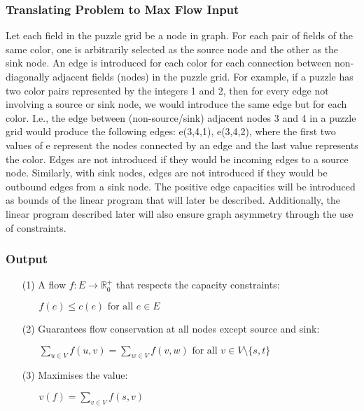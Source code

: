 \documentclass{homeworg}
\begin{document}
\subsubsection{Translating Problem to Max Flow Input}
Let each field in the puzzle grid be a node in graph. For each pair of fields of the same color, one is arbitrarily selected as the source node and the other as the sink node. An edge is introduced for each color for each connection between non-diagonally adjacent fields (nodes) in the puzzle grid. For example, if a puzzle has two color pairs represented by the integers 1 and 2, then for every edge not involving a source or sink node, we would introduce the same edge but for each color. I.e., the edge between (non-source/sink) adjacent nodes 3 and 4 in a puzzle grid would produce the following edges: e(3,4,1), e(3,4,2), where the first two values of e represent the nodes connected by an edge and the last value represents the color. Edges are not introduced if they would be incoming edges to a source node. Similarly, with sink nodes, edges are not introduced if they would be outbound edges from a sink node. The positive edge capacities will be introduced as bounds of the linear program that will later be described. Additionally, the linear program described later will also ensure graph asymmetry through the use of constraints. 
\subsubsection{Output}
\begin{enumerate}
    \item[(1)] A flow \(f:E\rightarrow \mathbb{R}_0^+\) that respects the capacity constraints:
        \begin{enumerate}
        	\item[] \(f(e)\leq c(e) \text{ for all } e \in E\)
        \end{enumerate}
    \item[(2)] Guarantees flow conservation at all nodes except source and sink: 
        \begin{enumerate}
        	\item[] \(\displaystyle\sum_{u \in V} f(u, v) = \sum_{w \in V} f(v, w) \text{ for all }v\in V \text{\textbackslash} \{s, t\}\)
        	\end{enumerate}
	\item[(3)] Maximises the value:
        \begin{enumerate}
        	\item[] \(v(f)=\displaystyle\sum_{v \in V}f(s, v)\)
        \end{enumerate}
\end{enumerate}
\end{document}
